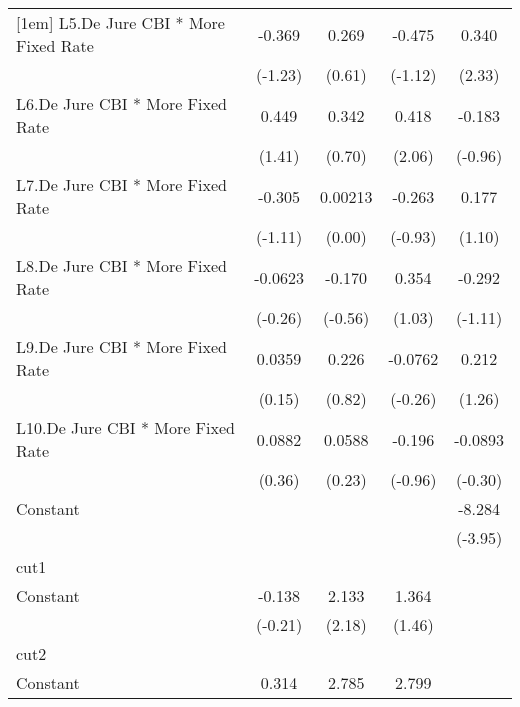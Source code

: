 {\begin{longtable}{l*{4}{c}}
[1em]
L5.De Jure CBI * More Fixed Rate&   -0.369         &    0.269         &   -0.475         &    0.340\sym{*}  \\
                &  (-1.23)         &   (0.61)         &  (-1.12)         &   (2.33)         \\
[1em]
L6.De Jure CBI * More Fixed Rate&    0.449         &    0.342         &    0.418\sym{*}  &   -0.183         \\
                &   (1.41)         &   (0.70)         &   (2.06)         &  (-0.96)         \\
[1em]
L7.De Jure CBI * More Fixed Rate&   -0.305         &  0.00213         &   -0.263         &    0.177         \\
                &  (-1.11)         &   (0.00)         &  (-0.93)         &   (1.10)         \\
[1em]
L8.De Jure CBI * More Fixed Rate&  -0.0623         &   -0.170         &    0.354         &   -0.292         \\
                &  (-0.26)         &  (-0.56)         &   (1.03)         &  (-1.11)         \\
[1em]
L9.De Jure CBI * More Fixed Rate&   0.0359         &    0.226         &  -0.0762         &    0.212         \\
                &   (0.15)         &   (0.82)         &  (-0.26)         &   (1.26)         \\
[1em]
L10.De Jure CBI * More Fixed Rate&   0.0882         &   0.0588         &   -0.196         &  -0.0893         \\
                &   (0.36)         &   (0.23)         &  (-0.96)         &  (-0.30)         \\
[1em]
Constant        &                  &                  &                  &   -8.284\sym{***}\\
                &                  &                  &                  &  (-3.95)         \\
\hline
cut1            &                  &                  &                  &                  \\
Constant        &   -0.138         &    2.133\sym{*}  &    1.364         &                  \\
                &  (-0.21)         &   (2.18)         &   (1.46)         &                  \\
\hline
cut2            &                  &                  &                  &                  \\
Constant        &    0.314         &    2.785\sym{**} &    2.799\sym{**} &                  \\

\end{longtable}}
